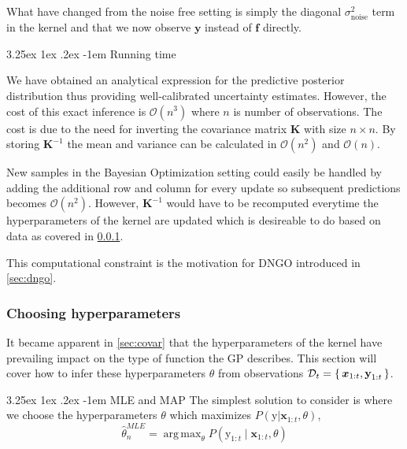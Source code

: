 \documentclass[conference,compsoc]{IEEEtran}
\makeatletter
\def\paragraph{\@startsection{paragraph}{4}{\z@}%
                                    {3.25ex \@plus1ex \@minus.2ex}%
                                    {-1em}%
                                    {\normalfont\normalsize\bfseries}}
\DeclareMathOperator*{\argmax}{arg\,max}
\theoremstyle{definition}
\makeatother
\begin{document}
                What have changed from the noise free setting is simply the diagonal $\sigma_{\mathrm{noise}}^2$ term in the kernel and that we now observe $\bm{y}$ instead of $\bm{f}$ directly.

            \paragraph{Running time}\label{sec:runningtime}

                We have obtained an analytical expression for the predictive posterior distribution thus providing well-calibrated uncertainty estimates.
                However, the cost of this exact inference is $\mathcal{O}(n^3)$ where $n$ is number of observations.
                The cost is due to the need for inverting the covariance matrix $\bm{K}$ with size $n \times n$. %
                By storing $\bm{K}^{-1}$ the mean and variance can be calculated in $\mathcal{O}(n^2)$ and $\mathcal{O}(n)$.

                New samples in the Bayesian Optimization setting could easily be handled by adding the additional row and column for every update so subsequent predictions becomes $\mathcal{O}(n^2)$.
                However, $\bm{K}^{-1}$ would have to be recomputed everytime the hyperparameters of the kernel are updated which is desireable to do based on data as covered in \cref{sec:choosehyper}.

                This computational constraint is the motivation for DNGO introduced in \cref{sec:dngo}.

        \subsubsection{Choosing hyperparameters}\label{sec:choosehyper}
        
            It became apparent in \cref{sec:covar} that the hyperparameters of the kernel have prevailing impact on the type of function the GP describes.
            This section will cover how to infer these hyperparameters $\theta$ from observations $\mathcal{D}_t=\set{\bm{x}_{1:t},\bm{\mathrm{y}}_{1:t}}$.

            \paragraph{MLE and MAP}
                The simplest solution to consider is where we choose the hyperparameters $\theta$ which maximizes $P(\bm{\mathrm{y}}|\bm{x}_{1:t},\theta)$,
                    \begin{equation}
                        \hat{\theta}_n^{MLE} = \argmax_{\theta} P(\bm{\mathrm{y}}_{1:t}\mid\bm{x}_{1:t},\theta)
                    \end{equation}
\end{document}

